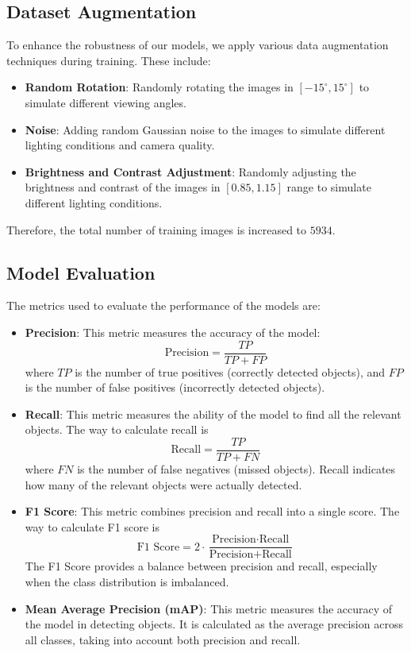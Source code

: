 \documentclass{article}
\begin{document}
\subsection{Dataset Augmentation}
To enhance the robustness of our models, we apply various data augmentation techniques during training. These include:
\begin{itemize}
\item \textbf{Random Rotation}: Randomly rotating the images in $[-15^{\circ}, 15^{\circ}]$ to simulate different viewing angles.
\item \textbf{Noise}: Adding random Gaussian noise to the images to simulate different lighting conditions and camera quality.
\item \textbf{Brightness and Contrast Adjustment}: Randomly adjusting the brightness and contrast of the images in $[0.85, 1.15]$ range to simulate different lighting conditions.
\end{itemize}
Therefore, the total number of training images is increased to $5934$.

\subsection{Model Evaluation}

The metrics used to evaluate the performance of the models are:
\begin{itemize}
  \item \textbf{Precision}:   This metric measures the accuracy of the model: 
  $$
  \text{Precision} = \frac{TP}{TP + FP}
  $$
  where $TP$ is the number of true positives (correctly detected objects), and $FP$ is the number of false positives (incorrectly detected objects). 
  \item \textbf{Recall}: This metric measures the ability of the model to find all the relevant objects. The way to calculate recall is
  $$
  \text{Recall} = \frac{TP}{TP + FN}
  $$
  where $FN$ is the number of false negatives (missed objects). Recall indicates how many of the relevant objects were actually detected.
  \item \textbf{F1 Score}: This metric combines precision and recall into a single score. The way to calculate F1 score is
  $$
  \text{F1 Score} = 2 \cdot \frac{\text{Precision} \cdot \text{Recall}}{\text{Precision} + \text{Recall}}
  $$
  The F1 Score provides a balance between precision and recall, especially when the class distribution is imbalanced.
  \item \textbf{Mean Average Precision (mAP)}: This metric measures the accuracy of the model in detecting objects. It is calculated as the average precision across all classes, taking into account both precision and recall.
\end{itemize}
\end{document}
